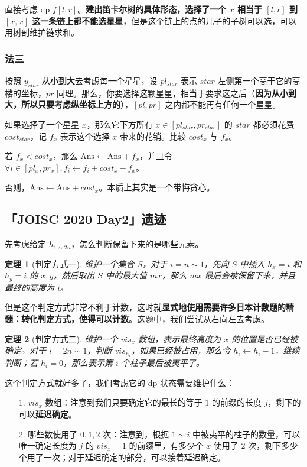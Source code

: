 \documentclass[12pt, a4paper, oneside]{ctexart}
\newtheorem{theorem}{定理}[subsection]
\begin{document}
直接考虑 dp $f[l,r]$。\textbf{建出笛卡尔树的具体形态，选择了一个 $x$ 相当于 $[l,r]$ 到 $[x,x]$ 这一条链上都不能选星星}，但是这个链上的点的儿子的子树可以选，可以用树剖维护链求和。

\subsubsection{法三}

按照 $y_{star}$ 从\textbf{小到大}去考虑每一个星星，设 $pl_{star}$ 表示 $star$ 左侧第一个高于它的高楼的坐标，$pr$ 同理。那么，你要选择这颗星星，相当于要求这之后（\textbf{因为从小到大，所以只要考虑纵坐标上方的}），$[pl,pr]$ 之内都不能再有任何一个星星。

如果选择了一个星星 $x$，那么它下方所有 $x\in[pl_{star},pr_{star}]$ 的 $star$ 都必须花费 $cost_{star}$，记 $f_x$ 表示这个选择 $x$ 带来的花销。比较 $cost_x$ 与 $f_x$。

若 $f_x<cost_x$，那么 $\mathrm{Ans}\leftarrow\mathrm{Ans}+f_x$，并且令 $\forall i\in[pl_x,pr_x],f_i\leftarrow f_i+cost_x-f_x$。

否则，$\mathrm{Ans}\leftarrow\mathrm{Ans}+cost_x$。本质上其实是一个带悔贪心。

\subsection{「JOISC 2020 Day2」遗迹}

先考虑给定 $h_{1\sim 2n}$，怎么判断保留下来的是哪些元素。

\begin{theorem}[判定方式一]
    维护一个集合 $S$，对于 $i=n\sim 1$，先向 $S$ 中插入 $h_x=i$ 和 $h_y=i$ 的 $x,y$，然后取出 $S$ 中的最大值 $mx$，那么 $mx$ 最后会被保留下来，并且最终的高度为 $i$。
\end{theorem}

但是这个判定方式非常不利于计数，这时就\textbf{显式地使用需要许多日本计数题的精髓：转化判定方式，使得可以计数}。这题中，我们尝试从右向左去考虑。

\begin{theorem}[判定方式二]
    维护一个 $vis_x$ 数组，表示最终高度为 $x$ 的位置是否已经被确定。对于 $i=2n\sim 1$，判断 $vis_{h_i}$，如果已经被占用，那么令 $h_i\leftarrow h_i-1$，继续判断；若 $h_i=0$，那么表示第 $i$ 个柱子最后被夷平了。 
\end{theorem}

这个判定方式就好多了，我们考虑它的 dp 状态需要维护什么：

\begin{itemize}
    \item[1.] $vis_x$ 数组：注意到我们只要确定它的最长的等于 $1$ 的前缀的长度 $j$，剩下的可以\textbf{延迟确定}。
    \item[2.] 哪些数使用了 $0,1,2$ 次：注意到，根据 $1\sim i$ 中被夷平的柱子的数量，可以唯一确定长度为 $j$ 的 $vis_x=1$ 的前缀里，有多少个 $x$ 使用了 $2$ 次，剩下多少个用了一次；对于延迟确定的部分，可以接着延迟确定。
\end{itemize}
\end{document}
